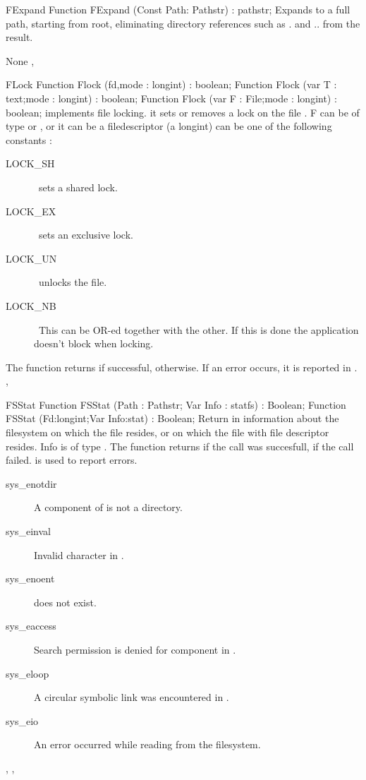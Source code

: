\begin{function}{FExpand}
\Declaration
Function FExpand (Const Path: Pathstr) : pathstr;
\Description
 Expands  to a full path, starting from root,
eliminating directory references such as . and .. from the result.

\Errors
None
\SeeAlso
{}, 
\end{function}


\begin{function}{FLock}
\Declaration
Function  Flock (fd,mode : longint) : boolean;
Function  Flock (var T : text;mode : longint) : boolean;
Function  Flock (var F : File;mode : longint) : boolean;
\Description
{} implements file locking. it sets or removes a lock on the file
. F can be of type  or , or it can be a \linux
filedescriptor (a longint)
 can be one of the following constants :
\begin{description}
\item [LOCK\_SH] \ sets a shared lock.
\item [LOCK\_EX] \ sets an exclusive lock.
\item [LOCK\_UN] \ unlocks the file.
\item [LOCK\_NB] \ This can be OR-ed together with the other. If this is done
the application doesn't block when locking.
\end{description}

The function returns  if successful,  otherwise.
\Errors
If an error occurs, it is reported in .
\SeeAlso
{}, 
\end{function}

\begin{function}{FSStat}
\Declaration
Function FSStat (Path : Pathstr; Var Info : statfs) : Boolean;
Function FSStat (Fd:longint;Var Info:stat) : Boolean;
\Description
 Return in  information about the filesystem on which the file
 resides, or on which the file with file descriptor 
resides. 
Info is of type . The function returns  if the call 
was succesfull,  if the call failed.
\Errors
  is used to report errors.
\begin{description}
\item[sys\_enotdir] A component of  is not a directory.
\item[sys\_einval] Invalid character in .
\item[sys\_enoent]  does not exist.
\item[sys\_eaccess] Search permission is denied for  component in
.
\item[sys\_eloop] A circular symbolic link was encountered in .
\item[sys\_eio] An error occurred while reading from the filesystem.
\end{description}

\SeeAlso
{}, , 
\end{function}

